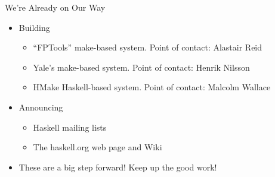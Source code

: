 \documentclass[pdf,rico,slideColor,colorBG]{prosper}
\begin{document}
\begin{slide}{We're Already on Our Way}
\begin{itemize}
\item Building \begin{itemize}
  \item ``FPTools'' make-based system.  Point of contact: Alastair Reid
  \item Yale's make-based system.  Point of contact: Henrik Nilsson
  \item HMake Haskell-based system.  Point of contact: Malcolm Wallace
   \end{itemize}
 \item Announcing \begin{itemize}
   \item Haskell mailing lists
   \item The haskell.org web page and Wiki
   \end{itemize}
 \item These are a big step forward!  Keep up the good work!
\end{itemize}
\end{slide}

\end{document}
